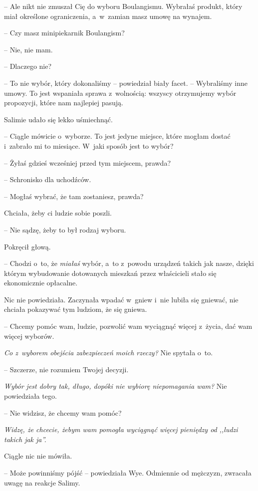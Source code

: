 \documentclass[oneside,polish,11pt,sfheadings]{mwbk}
\begin{document}
-- Ale nikt nie zmuszał Cię do wyboru Boulangismu. Wybrałaś produkt,
który miał określone ograniczenia, a~w~zamian masz umowę na wynajem.

-- Czy masz minipiekarnik Boulangism?

-- Nie, nie mam.

-- Dlaczego nie?

-- To nie wybór, który dokonaliśmy -- powiedział biały facet. -- Wybraliśmy
inne umowy. To jest wspaniała sprawa z~wolnością: wszyscy otrzymujemy
wybór propozycji, które nam najlepiej pasują.

Salimie udało się lekko uśmiechnąć. 

-- Ciągle mówicie o~wyborze. To jest
jedyne miejsce, które mogłam dostać i~zabrało mi to miesiące. W~jaki
sposób jest to wybór?

-- Żyłaś gdzieś wcześniej przed tym miejscem, prawda?

-- Schronisko dla uchodźców.

-- Mogłaś wybrać, że tam zostaniesz, prawda?

Chciała, żeby ci ludzie sobie poszli. 

-- Nie sądzę, żeby to był rodzaj
wyboru.

Pokręcił głową. 

-- Chodzi o~to, że \textit{miałaś} wybór, a~to z~powodu
urządzeń takich jak nasze, dzięki którym wybudowanie dotowanych mieszkań
przez właścicieli stało się ekonomicznie opłacalne.

Nic nie powiedziała. Zaczynała wpadać w~gniew i~nie lubiła się gniewać,
nie chciała pokazywać tym ludziom, że się gniewa.

-- Chcemy pomóc wam, ludzie, pozwolić wam wyciągnąć więcej z~życia, dać
wam więcej wyborów.

\textit{Co z~wyborem obejścia zabezpieczeń moich rzeczy?} Nie spytała o~to.

-- Szczerze, nie rozumiem Twojej decyzji.

\textit{Wybór jest dobry tak, długo, dopóki nie wybiorę niepomagania wam?}
Nie powiedziała tego.

-- Nie widzisz, że chcemy wam pomóc?

\textit{Widzę, że chcecie, żebym wam pomogła wyciągnąć więcej pieniędzy od
,,ludzi takich jak ja''.}

Ciągle nic nie mówiła.

-- Może powinniśmy pójść -- powiedziała Wye. Odmiennie od mężczyzn,
zwracała uwagę na reakcje Salimy.
\end{document}
